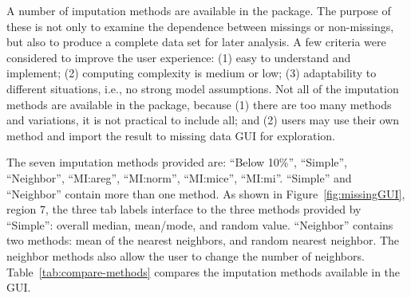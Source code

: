 \documentclass[article]{jss}
\begin{document}
A number of imputation methods are available in the package. The purpose of these is not only to examine the dependence between missings or non-missings, but also to produce a complete data set for later analysis. A few criteria were considered to improve the user experience: (1) easy to understand and implement; (2) computing complexity is medium or low; (3) adaptability to different situations, i.e., no strong model assumptions. Not all of the imputation methods are available in the package, because (1) there are too many methods and variations, it is not practical to include all; and (2) users may use their own method and import the result to missing data GUI for exploration.

The seven imputation methods provided are: 
``Below 10\%'', ``Simple'', ``Neighbor'', ``MI:areg'', ``MI:norm'', ``MI:mice'', ``MI:mi''. 
``Simple'' and ``Neighbor'' contain more than one method. As shown in Figure~\ref{fig:missingGUI}, region 7, the three tab labels interface to the three methods provided by ``Simple'': overall median, mean/mode, and random value. ``Neighbor'' contains two methods: mean of the nearest neighbors, and random nearest neighbor. The neighbor methods also allow the user to change the number of neighbors. Table~\ref{tab:compare-methods} compares the imputation methods available in the GUI.
\end{document}
